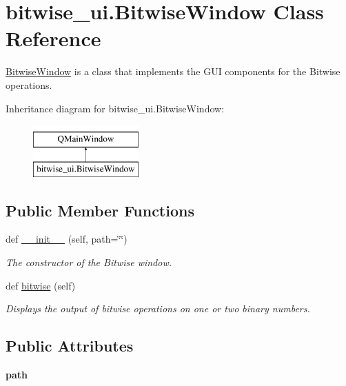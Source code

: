 \hypertarget{classbitwise__ui_1_1_bitwise_window}{}\section{bitwise\+\_\+ui.\+Bitwise\+Window Class Reference}
\label{classbitwise__ui_1_1_bitwise_window}


\hyperlink{classbitwise__ui_1_1_bitwise_window}{Bitwise\+Window} is a class that implements the G\+UI components for the Bitwise operations.  


Inheritance diagram for bitwise\+\_\+ui.\+Bitwise\+Window\+:\begin{figure}[H]
\begin{center}
\leavevmode
\includegraphics[height=2.000000cm]{classbitwise__ui_1_1_bitwise_window}
\end{center}
\end{figure}
\subsection*{Public Member Functions}
\begin{DoxyCompactItemize}
\item 
def \hyperlink{classbitwise__ui_1_1_bitwise_window_a5f91a64a61e0cd5282e40925c4417171}{\+\_\+\+\_\+init\+\_\+\+\_\+} (self, path=\char`\"{}\char`\"{})
\begin{DoxyCompactList}\small\item\em The constructor of the Bitwise window. \end{DoxyCompactList}\item 
def \hyperlink{classbitwise__ui_1_1_bitwise_window_a3eafe17fad0d129cd2bbab0d84e0e450}{bitwise} (self)
\begin{DoxyCompactList}\small\item\em Displays the output of bitwise operations on one or two binary numbers. \end{DoxyCompactList}\end{DoxyCompactItemize}
\subsection*{Public Attributes}
\begin{DoxyCompactItemize}
\item 
\mbox{\label{classbitwise__ui_1_1_bitwise_window_a50c5338d7eec89d033c090bd0efd525a}} 
{\bfseries path}
\end{DoxyCompactItemize}


